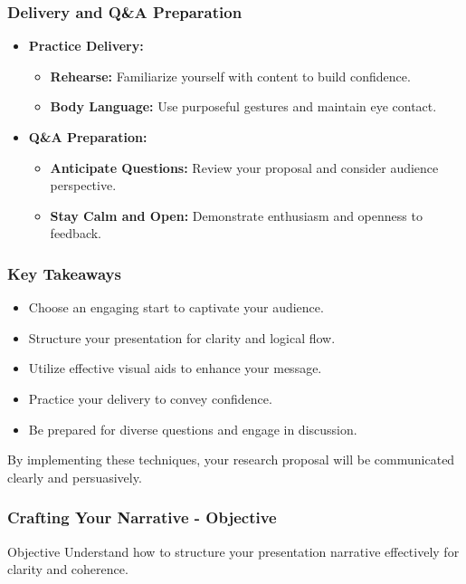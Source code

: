 \documentclass[aspectratio=169]{beamer}
\begin{document}
\begin{frame}[fragile]
    \frametitle{Delivery and Q\&A Preparation}
    \begin{itemize}
        \item \textbf{Practice Delivery:}
            \begin{itemize}
                \item \textbf{Rehearse:} Familiarize yourself with content to build confidence.
                \item \textbf{Body Language:} Use purposeful gestures and maintain eye contact.
            \end{itemize}
        \item \textbf{Q\&A Preparation:}
            \begin{itemize}
                \item \textbf{Anticipate Questions:} Review your proposal and consider audience perspective.
                \item \textbf{Stay Calm and Open:} Demonstrate enthusiasm and openness to feedback.
            \end{itemize}
    \end{itemize}
\end{frame}

\begin{frame}[fragile]
    \frametitle{Key Takeaways}
    \begin{itemize}
        \item Choose an engaging start to captivate your audience.
        \item Structure your presentation for clarity and logical flow.
        \item Utilize effective visual aids to enhance your message.
        \item Practice your delivery to convey confidence.
        \item Be prepared for diverse questions and engage in discussion.
    \end{itemize}
    By implementing these techniques, your research proposal will be communicated clearly and persuasively.
\end{frame}

\begin{frame}[fragile]
    \frametitle{Crafting Your Narrative - Objective}
    \begin{block}{Objective}
        Understand how to structure your presentation narrative effectively for clarity and coherence.
    \end{block}
\end{frame}
\end{document}

